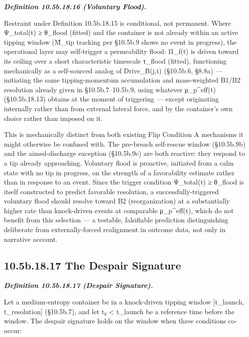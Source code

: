 \documentclass[
]{article}
\begin{document}
\emph{\textbf{Definition 10.5b.18.16 (Voluntary Flood).}}

Restraint under Definition 10.5b.18.15 is conditional, not permanent.
Where Ψ\_total(t) ≥ θ\_flood (fitted) and the container is not already
within an active tipping window (M̃\_tip tracking per §10.5b.9 shows no
event in progress), the operational layer may self-trigger a
permeability flood: Π\_f(t) is driven toward its ceiling over a short
characteristic timescale τ\_flood (fitted), functioning mechanically as
a self-sourced analog of Drive\_B(j,t) (§10.5b.6, §8.8a) --- initiating
the same tipping-momentum accumulation and mass-weighted B1/B2
resolution already given in §10.5b.7--10.5b.9, using whatever
μ\_p\^{}eff(t) (§10.5b.18.13) obtains at the moment of triggering ---
except originating internally rather than from external lateral force,
and by the container's own choice rather than imposed on it.

This is mechanically distinct from both existing Flip Condition A
mechanisms it might otherwise be confused with. The pre-breach
self-rescue window (§10.5b.9b) and the aimed-discharge exception
(§10.5b.9c) are both reactive: they respond to a tip already
approaching. Voluntary flood is proactive, initiated from a calm state
with no tip in progress, on the strength of a favorability estimate
rather than in response to an event. Since the trigger condition
Ψ\_total(t) ≥ θ\_flood is itself constructed to predict favorable
resolution, a successfully-triggered voluntary flood should resolve
toward B2 (reorganization) at a substantially higher rate than
knock-driven events at comparable μ\_p\^{}eff(t), which do not benefit
from this selection --- a testable, falsifiable prediction
distinguishing deliberate from externally-forced realignment in outcome
data, not only in narrative account.

\hypertarget{b.18.17-the-despair-signature}{%
\subsection{10.5b.18.17 The Despair
Signature}\label{b.18.17-the-despair-signature}}

\emph{\textbf{Definition 10.5b.18.17 (Despair Signature).}}

Let a medium-entropy container be in a knock-driven tipping window
{[}t\_launch, t\_resolution{]} (§10.5b.7), and let t₀ \textless{}
t\_launch be a reference time before the window. The despair signature
holds on the window when three conditions co-occur:
\end{document}
